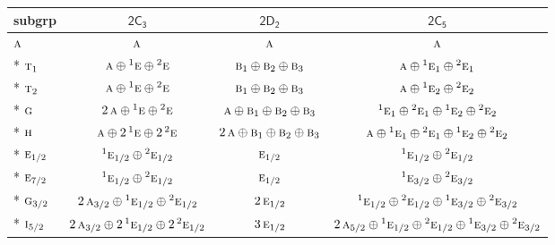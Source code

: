 \documentclass[10pt,a4paper]{article}
\numberwithin{equation}{section}
\newcommand{\grp}[1]{\mathsf{#1}}
\newcommand{\irr}[1]{\text{\normalfont\scshape #1}}
\newcommand{\conjpair}[1]{{}^{#1}}
\begin{document}
{\small\begin{longtable}{@{}lccc@{}}\toprule
subgrp & \href{2C3.pdf}{$\grp{2C_{3}}$} & \href{2D2.pdf}{$\grp{2D_{2}}$} & \href{2C5.pdf}{$\grp{2C_{5}}$}\\\midrule\endhead
\bottomrule\endfoot\endlastfoot
$\irr{a}$ & $\irr{a}$ & $\irr{a}$ & $\irr{a}$\\*
$\irr{t}_{1}$ & $\irr{a}\oplus \conjpair{1}\irr{e}\oplus \conjpair{2}\irr{e}$ & $\irr{b}_{1}\oplus \irr{b}_{2}\oplus \irr{b}_{3}$ & $\irr{a}\oplus \conjpair{1}\irr{e}_{1}\oplus \conjpair{2}\irr{e}_{1}$\\*
$\irr{t}_{2}$ & $\irr{a}\oplus \conjpair{1}\irr{e}\oplus \conjpair{2}\irr{e}$ & $\irr{b}_{1}\oplus \irr{b}_{2}\oplus \irr{b}_{3}$ & $\irr{a}\oplus \conjpair{1}\irr{e}_{2}\oplus \conjpair{2}\irr{e}_{2}$\\*
$\irr{g}$ & $2\,\irr{a}\oplus \conjpair{1}\irr{e}\oplus \conjpair{2}\irr{e}$ & $\irr{a}\oplus \irr{b}_{1}\oplus \irr{b}_{2}\oplus \irr{b}_{3}$ & $\conjpair{1}\irr{e}_{1}\oplus \conjpair{2}\irr{e}_{1}\oplus \conjpair{1}\irr{e}_{2}\oplus \conjpair{2}\irr{e}_{2}$\\*
$\irr{h}$ & $\irr{a}\oplus 2\,\conjpair{1}\irr{e}\oplus 2\,\conjpair{2}\irr{e}$ & $2\,\irr{a}\oplus \irr{b}_{1}\oplus \irr{b}_{2}\oplus \irr{b}_{3}$ & $\irr{a}\oplus \conjpair{1}\irr{e}_{1}\oplus \conjpair{2}\irr{e}_{1}\oplus \conjpair{1}\irr{e}_{2}\oplus \conjpair{2}\irr{e}_{2}$\\*
$\irr{e}_{1/2}$ & $\conjpair{1}\irr{e}_{1/2}\oplus \conjpair{2}\irr{e}_{1/2}$ & $\irr{e}_{1/2}$ & $\conjpair{1}\irr{e}_{1/2}\oplus \conjpair{2}\irr{e}_{1/2}$\\*
$\irr{e}_{7/2}$ & $\conjpair{1}\irr{e}_{1/2}\oplus \conjpair{2}\irr{e}_{1/2}$ & $\irr{e}_{1/2}$ & $\conjpair{1}\irr{e}_{3/2}\oplus \conjpair{2}\irr{e}_{3/2}$\\*
$\irr{g}_{3/2}$ & $2\,\irr{a}_{3/2}\oplus \conjpair{1}\irr{e}_{1/2}\oplus \conjpair{2}\irr{e}_{1/2}$ & $2\,\irr{e}_{1/2}$ & $\conjpair{1}\irr{e}_{1/2}\oplus \conjpair{2}\irr{e}_{1/2}\oplus \conjpair{1}\irr{e}_{3/2}\oplus \conjpair{2}\irr{e}_{3/2}$\\*
$\irr{i}_{5/2}$ & $2\,\irr{a}_{3/2}\oplus 2\,\conjpair{1}\irr{e}_{1/2}\oplus 2\,\conjpair{2}\irr{e}_{1/2}$ & $3\,\irr{e}_{1/2}$ & $2\,\irr{a}_{5/2}\oplus \conjpair{1}\irr{e}_{1/2}\oplus \conjpair{2}\irr{e}_{1/2}\oplus \conjpair{1}\irr{e}_{3/2}\oplus \conjpair{2}\irr{e}_{3/2}$\\
\bottomrule\end{longtable}}
\end{document}
